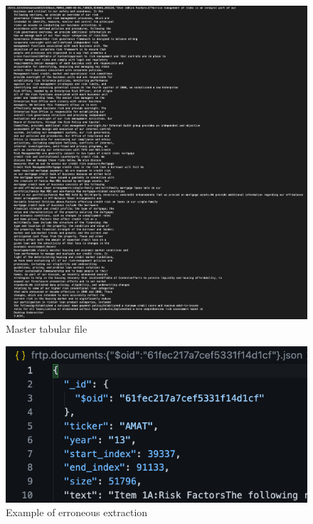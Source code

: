 \documentclass[12pt,MSc,a4paper,oneside]{muthesis}
\begin{document}
\label{appendix:3}
\begin{figure}[h]
    \centering
    \includegraphics[scale=0.25]{images/master_tabular_file.png}
    \caption{Master tabular file}
\end{figure}

\label{appendix:4}
\begin{figure}[h]
    \centering
    \includegraphics[scale=0.7]{images/erroneous_token.png}
    \caption{Example of erroneous extraction}
\end{figure}
\end{document}
